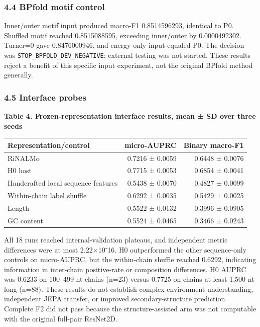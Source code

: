 \documentclass[
  11pt]{article}
\begin{document}
\hypertarget{44-bpfold-motif-control}{%
\subsubsection{4.4 BPfold motif control}\label{44-bpfold-motif-control}}

Inner/outer motif input produced macro-F1 0.8514596293, identical to P0.
Shuffled motif reached 0.8515088595, exceeding inner/outer by
0.0000492302. Turner=0 gave 0.8476000946, and energy-only input equaled
P0. The decision was \texttt{STOP\_BPFOLD\_DEV\_NEGATIVE}; external
testing was not started. These results reject a benefit of this specific
input experiment, not the original BPfold method generally.

\hypertarget{45-interface-probes}{%
\subsubsection{4.5 Interface probes}\label{45-interface-probes}}

\textbf{Table 4. Frozen-representation interface results, mean ± SD over
three seeds}

\begin{longtable}[]{@{}lrr@{}}
\toprule
Representation/control & micro-AUPRC & Binary macro-F1 \\
\midrule
\endhead
RiNALMo & 0.7216 ± 0.0059 & 0.6448 ± 0.0076 \\
H0 host & 0.7715 ± 0.0053 & 0.6854 ± 0.0041 \\
Handcrafted local sequence features & 0.5438 ± 0.0070 & 0.4827 ±
0.0099 \\
Within-chain label shuffle & 0.6292 ± 0.0035 & 0.5429 ± 0.0025 \\
Length & 0.5522 ± 0.0132 & 0.3996 ± 0.0905 \\
GC content & 0.5524 ± 0.0465 & 0.3466 ± 0.0243 \\
\bottomrule
\end{longtable}

All 18 runs reached internal-validation plateaus, and independent metric
differences were at most 2.22×10⁻16. H0 outperformed the other
sequence-only controls on micro-AUPRC, but the within-chain shuffle
reached 0.6292, indicating information in inter-chain positive-rate or
composition differences. H0 AUPRC was 0.6233 on 100--499 nt chains
(n=23) versus 0.7725 on chains at least 1,500 nt long (n=88). These
results do not establish complex-environment understanding, independent
JEPA transfer, or improved secondary-structure prediction. Complete F2
did not pass because the structure-assisted arm was not computable with
the original full-pair ResNet2D.
\end{document}
